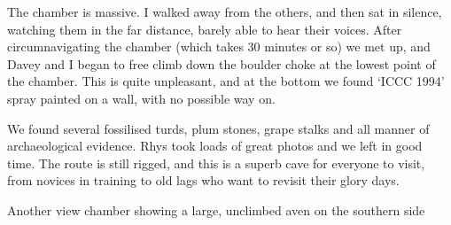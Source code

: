 The chamber is massive. I walked away from the others, and then sat in silence, watching them in the far distance, barely able to hear their voices. After circumnavigating the chamber (which takes 30 minutes or so) we met up, and Davey and I began to free climb down the boulder choke at the lowest point of the chamber. This is quite unpleasant, and at the bottom we found `ICCC 1994' spray painted on a wall, with no possible way on.

We found several fossilised turds, plum stones, grape stalks and all manner of archaeological evidence. Rhys took loads of great photos and we left in good time. The route is still rigged, and this is a superb cave for everyone to visit, from novices in training to old lags who want to revisit their glory days.


\begin{pagefigure}
\label{Ta Mokra}
\caption{  Another view \protect{} chamber showing a large, unclimbed aven on the southern side }
\end{pagefigure}




